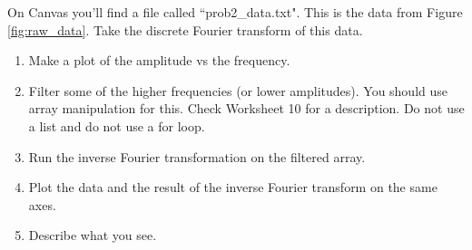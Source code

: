 \documentclass[11pt,letterpaper]{article}
\begin{document}
\begin{problem}
 On Canvas you'll find a file called ``prob2\_data.txt". This is the data from Figure 
\ref{fig:raw_data}. Take the discrete Fourier transform of this data.
\begin{enumerate}
 \item Make a plot of the amplitude vs the frequency.
 \item Filter some of the higher frequencies (or lower amplitudes). You should use array manipulation
for this. Check Worksheet 10 for a description. Do not use a list and do not use a for loop.
 \item Run the inverse Fourier transformation on the filtered array.
 \item Plot the data and the result of the inverse Fourier transform on the same axes. 
 \item Describe what you see.
\end{enumerate}
\end{problem}
\end{document}
